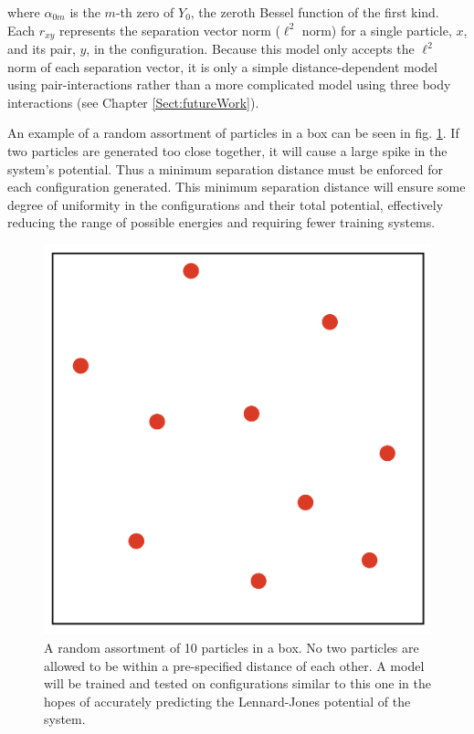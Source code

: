 where $\alpha_{0m}$ is the $m$-th zero of $Y_0$, the zeroth Bessel function of the first kind. Each $r_{xy}$ represents the separation vector norm ($\ell^2$ norm) for a single particle, $x$, and its pair, $y$, in the configuration. Because this model only accepts the $\ell^2$ norm of each separation vector, it is only a simple distance-dependent model using pair-interactions rather than a more complicated model using three body interactions (see Chapter \ref{Sect:futureWork}).

\par An example of a random assortment of particles in a box can be seen in fig. \ref{fig:tenParticles}. If two particles are generated too close together, it will cause a large spike in the system's potential. Thus a minimum separation distance must be enforced for each configuration generated. This minimum separation distance will ensure some degree of uniformity in the configurations and their total potential, effectively reducing the range of possible energies and requiring fewer training systems. 

\begin{figure}%
\centering
\includegraphics[scale = 0.3]{Figures/tenParticles}
\caption{A random assortment of 10 particles in a box. No two particles are allowed to be within a pre-specified distance of each other. A model will be trained and tested on configurations similar to this one in the hopes of accurately predicting the Lennard-Jones potential of the system. 
\label{fig:tenParticles}} 
\end{figure}

